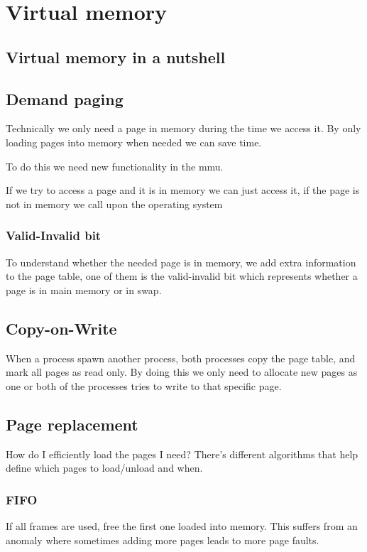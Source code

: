 \chapter{Virtual memory}
\section{Virtual memory in a nutshell}
\section{Demand paging}
Technically we only need a page in memory during the time we access it. By only loading pages into memory when needed we can save time.

To do this we need new functionality in the mmu.

If we try to access a page and it is in memory we can just access it, if the page is not in memory we call upon the operating system

\subsection{Valid-Invalid bit}
To understand whether the needed page is in memory, we add extra information to the page table, one of them is the valid-invalid bit which represents whether a page is in main memory or in swap.


\section{Copy-on-Write}
When a process spawn another process, both processes copy the page table, and mark all pages as read only. By doing this we only need to allocate new pages as one or both of the processes tries to write to that specific page.

\section{Page replacement}
How do I efficiently load the pages I need? There's different algorithms that help define which pages to load/unload and when.

\subsection{FIFO}
If all frames are used, free the first one loaded into memory. This suffers from an anomaly where sometimes adding more pages leads to more page faults.

